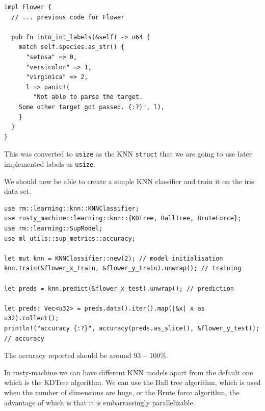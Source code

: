 \documentclass{book}
\begin{document}
\begin{lstlisting}[caption={chapter2\\/rust\\-lang\\/ml\\-utils\\/src\\/datasets\\.rs}]
impl Flower {
  // ... previous code for Flower

  pub fn into_int_labels(&self) -> u64 {
    match self.species.as_str() {
      "setosa" => 0,
      "versicolor" => 1,
      "virginica" => 2,
      l => panic!(
        "Not able to parse the target.
	Some other target got passed. {:?}", l),
    }
  }
}
\end{lstlisting}

This was converted to \lstinline{usize} as the KNN \lstinline{struct} that we are going to use later implemented labels as \lstinline{usize}.

We should now be able to create a simple KNN classifier and train it on the iris data set.

\begin{lstlisting}[caption={chapter2\\/rusty\_machine\_classification\\/src\\/main\\.rs}]
use rm::learning::knn::KNNClassifier;
use rusty_machine::learning::knn::{KDTree, BallTree, BruteForce};
use rm::learning::SupModel;
use ml_utils::sup_metrics::accuracy;

let mut knn = KNNClassifier::new(2); // model initialisation
knn.train(&flower_x_train, &flower_y_train).unwrap(); // training

let preds = knn.predict(&flower_x_test).unwrap(); // prediction

let preds: Vec<u32> = preds.data().iter().map(|&x| x as u32).collect();
println!("accuracy {:?}", accuracy(preds.as_slice(), &flower_y_test)); // accuracy
\end{lstlisting}

The accuracy reported should be around $93-100\%$.

In rusty-machine we can have different KNN models apart from the default one which is the KDTree algorithm. We can use the Ball tree algorithm, which is used when the number of dimensions are huge, or the Brute force algorithm, the advantage of which is that it is embarrassingly parallelizable.
\end{document}
